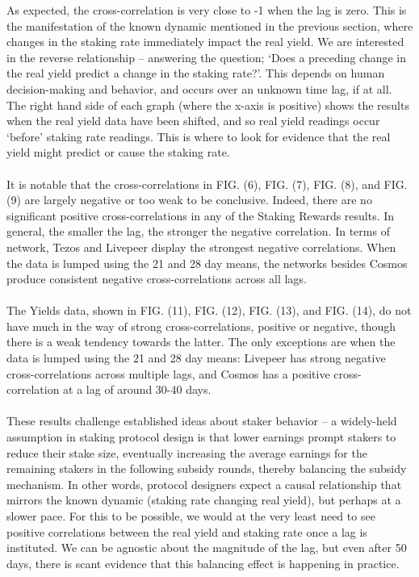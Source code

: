 \documentclass[longbibliography,nofootinbib]{revtex4-1}
\begin{document}
As expected, the cross-correlation is very close to -1 when the lag is zero. This is the manifestation of the known dynamic mentioned in the previous section, where changes in the staking rate immediately impact the real yield. We are interested in the reverse relationship – answering the question; `Does a preceding change in the real yield predict a change in the staking rate?'. This depends on human decision-making and behavior, and occurs over an unknown time lag, if at all. The right hand side of each graph (where the x-axis is positive) shows the results when the real yield data have been shifted, and so real yield readings occur `before' staking rate readings. This is where to look for evidence that the real yield might predict or cause the staking rate.
\\\\
It is notable that the cross-correlations in FIG. (6), FIG. (7), FIG. (8), and FIG. (9) are largely negative or too weak to be conclusive. Indeed, there are no significant positive cross-correlations in any of the Staking Rewards results. In general, the smaller the lag, the stronger the negative correlation. In terms of network, Tezos and Livepeer display the strongest negative correlations. When the data is lumped using the 21 and 28 day means, the networks besides Cosmos produce consistent negative cross-correlations across all lags.
\\\\
The Yields data, shown in FIG. (11), FIG. (12), FIG. (13), and FIG. (14), do not have much in the way of strong cross-correlations, positive or negative, though there is a weak tendency towards the latter. The only exceptions are when the data is lumped using the 21 and 28 day means: Livepeer has strong negative cross-correlations across multiple lags, and Cosmos has a positive cross-correlation at a lag of around 30-40 days. 
\\\\
These results challenge established ideas about staker behavior – a widely-held assumption in staking protocol design is that lower earnings prompt stakers to reduce their stake size, eventually increasing the average earnings for the remaining stakers in the following subsidy rounds, thereby balancing the subsidy mechanism. In other words, protocol designers expect a causal relationship that mirrors the known dynamic (staking rate changing real yield), but perhaps at a slower pace. For this to be possible, we would at the very least need to see positive correlations between the real yield and staking rate once a lag is instituted. We can be agnostic about the magnitude of the lag, but even after 50 days, there is scant evidence that this balancing effect is happening in practice.
\end{document}
